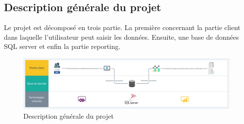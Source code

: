 \documentclass[a4paper]{report}
\begin{document}
\begin{doublespace}
\begin{doublespace}
        \subsection{Description générale du projet}
        Le projet est décomposé en trois partie. La première concernant la partie
        client dans laquelle l'utilisateur peut saisir les données. Ensuite, une base
        de données SQL server et enfin la partie reporting.
        \begin{figure}[H]
            \begin{center}
                \includegraphics[scale=0.2]{images/descrip-projet.png}
                \caption{Description générale du projet}
            \end{center}
        \end{figure}

\end{doublespace}
\end{doublespace}
\end{document}
